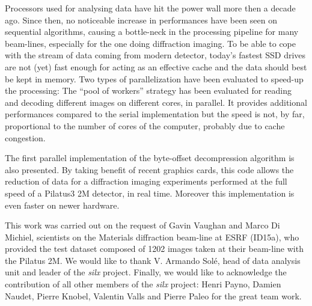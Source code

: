 \documentclass[preprint]{iucr}              %
\begin{document}
Processors used for analysing data have hit the power wall more then
a  decade ago.
Since then,  no noticeable increase in performances have been seen on
sequential algorithms, causing a bottle-neck in the processing
pipeline for many beam-lines, especially for the one doing diffraction imaging.
To be able to cope with the stream of data coming from modern detector,
today's fastest SSD drives are not (yet) fast  enough for acting as an
effective cache and the data should best be kept in memory.
Two types of parallelization have been evaluated to speed-up the processing:  
The ``pool of workers'' strategy has been evaluated for reading and decoding
different images on different cores, in parallel.
It provides additional performances compared to the serial implementation but
the speed is not, by far, proportional to the number of cores of the computer,
probably due to cache congestion.

The first parallel implementation of the byte-offset decompression 
algorithm is also presented. 
By taking benefit of recent graphics cards, this code allows the reduction
of data for a diffraction imaging experiments performed at the full speed of
a Pilatus3 2M detector, in real time. 
Moreover this implementation is even faster on newer hardware. 

 
This work was carried out on the request of Gavin Vaughan and Marco Di
Michiel, scientists on the Materials diffraction beam-line at ESRF (ID15a), who
provided the test dataset composed of 1202 images taken at their beam-line with
the Pilatus 2M.
We would like to thank V. Armando Solé, head of data analysis unit and leader
of the \textit{silx} project. 
Finally, we would like to acknowledge the contribution of all other members
of the \textit{silx} project:
Henri Payno, Damien Naudet, Pierre Knobel, Valentin Valls and
Pierre Paleo for the great team work.



\end{document}
